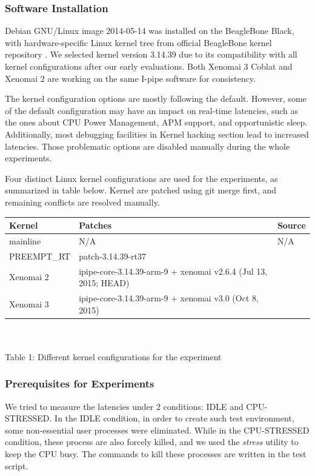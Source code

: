 \documentclass[10pt,a4paper]{article}
\begin{document}
\begin{multicols}{2}
\subsubsection{Software Installation}
Debian GNU/Linux image 2014-05-14 \cite{debian} was installed on the BeagleBone Black, with hardware-specific Linux kernel tree from official BeagleBone kernel repository \cite{kernel}. We selected kernel version 3.14.39 due to its compatibility with all kernel configurations after our early evaluations. Both Xenomai 3 Coblat and Xenomai 2 are working on the same I-pipe software for consistency.

The kernel conﬁguration options are mostly following the default. However, some of the default configuration may have an impact on real-time latencies, such as the ones about CPU Power Management, APM support, and opportunistic sleep. Additionally, most debugging facilities in Kernel hacking section lead to increased latencies. Those problematic options are disabled manually during the whole experiments.

Four distinct Linux kernel configurations are used for the experiments, as summarized in table below. Kernel are patched using git merge first, and remaining conflicts are resolved manually.

\begin{tabular}{|l| p{3cm} |l|}
\hline
Kernel & Patches & Source\\ \hline
mainline   & N/A & N/A \\ \hline
PREEMPT\_RT & patch-3.14.39-rt37 & \cite{p-rt} \\ \hline
Xenomai 2  & ipipe-core-3.14.39-arm-9 + xenomai v2.6.4 (Jul 13, 2015; HEAD) & \cite{p-ipipe} \cite{git-x2.6} \\ \hline
Xenomai 3  & ipipe-core-3.14.39-arm-9 + xenomai v3.0 (Oct 8, 2015) & \cite{p-ipipe} \cite{git-x3} \\ \hline
\end{tabular}\\
\vspace{4mm} \\
Table 1: Different kernel configurations for the experiment\\

\subsubsection{Prerequisites for Experiments}
We tried to measure the latencies under 2 conditions: IDLE and CPU-STRESSED. In the IDLE condition, in order to create such test environment, some non-essential user processes were eliminated. While in the CPU-STRESSED condition, these process are also forcely killed, and we used the \textit{stress} \cite{stress} utility to keep the CPU busy. The commands to kill these processes are written in the test script.


\end{multicols}
\end{document}
